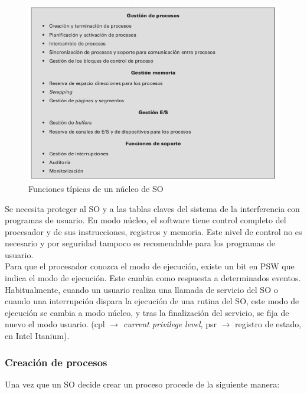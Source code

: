 \documentclass{article}
\begin{document}
				\begin{figure}
				\caption{Funciones típicas de un núcleo de SO}
				\label{figura2.14:funciones_kernel}
				\centering
				\includegraphics[width=1\textwidth, scale=1]{tema_2_figura14.png}
				\end{figure}
				
				Se necesita proteger al SO y a las tablas claves del sistema de la interferencia con programas de usuario. En modo núcleo, el software tiene control completo del procesador y de sus instrucciones, registros y memoria. Este nivel de control no es necesario y por seguridad tampoco es recomendable para los programas de usuario. \\
				
				Para que el procesador conozca el modo de ejecución, existe un bit en PSW que indica el modo de ejecución. Este cambia como respuesta a determinados eventos. Habitualmente, cuando un usuario realiza una llamada de servicio del SO o cuando una interrupción dispara la ejecución de una rutina del SO, este modo de ejecución se cambia a modo núcleo, y tras la finalización del servicio, se fija de nuevo el modo usuario. (cpl $\rightarrow$ \textit{current privilege level}, psr $\rightarrow$ registro de estado, en Intel Itanium).
				
			\subsubsection{Creación de procesos}
				Una vez que un SO decide crear un proceso procede de la siguiente manera:
				
\end{document}
